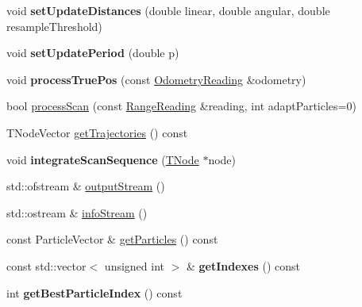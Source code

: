 \begin{DoxyCompactItemize}
void {\bfseries set\+Update\+Distances} (double linear, double angular, double resample\+Threshold)
\item 
\mbox{\label{classGMapping_1_1GridSlamProcessor_a37b6e3cfceeae5b20fd34888551464e4}} 
void {\bfseries set\+Update\+Period} (double p)
\item 
\mbox{\label{classGMapping_1_1GridSlamProcessor_ae95960a9452ea93a6002a92ff8cd4777}} 
void {\bfseries process\+True\+Pos} (const \hyperlink{classGMapping_1_1OdometryReading}{Odometry\+Reading} \&odometry)
\item 
bool \hyperlink{classGMapping_1_1GridSlamProcessor_a34c7f216947ee4c8ac05d5a53366aa5d}{process\+Scan} (const \hyperlink{classGMapping_1_1RangeReading}{Range\+Reading} \&reading, int adapt\+Particles=0)
\item 
T\+Node\+Vector \hyperlink{classGMapping_1_1GridSlamProcessor_a78fbf89b86513284f191d6c96755ffcf}{get\+Trajectories} () const
\item 
\mbox{\label{classGMapping_1_1GridSlamProcessor_a9f3ed3d072d48b81b5abb76a3dd848b6}} 
void {\bfseries integrate\+Scan\+Sequence} (\hyperlink{structGMapping_1_1GridSlamProcessor_1_1TNode}{T\+Node} $\ast$node)
\item 
std\+::ofstream \& \hyperlink{classGMapping_1_1GridSlamProcessor_a4cd45d059a6cc1b82cb7688addccfd29}{output\+Stream} ()
\item 
std\+::ostream \& \hyperlink{classGMapping_1_1GridSlamProcessor_ae7be39c0e2a9cea422e1a76c96a407b6}{info\+Stream} ()
\item 
const Particle\+Vector \& \hyperlink{classGMapping_1_1GridSlamProcessor_ae6ed37b49322fa55dc65a53f737188d3}{get\+Particles} () const
\item 
\mbox{\label{classGMapping_1_1GridSlamProcessor_aa3ce119ab73a7bcddca24b031fe61fa4}} 
const std\+::vector$<$ unsigned int $>$ \& {\bfseries get\+Indexes} () const
\item 
\mbox{\label{classGMapping_1_1GridSlamProcessor_ab79f70268a5facacc079748b0bc069b7}} 
int {\bfseries get\+Best\+Particle\+Index} () const
\item 
\mbox{\label{classGMapping_1_1GridSlamProcessor_a2d39e20b20691b27676d36273b91a69e}} 

\end{DoxyCompactItemize}
